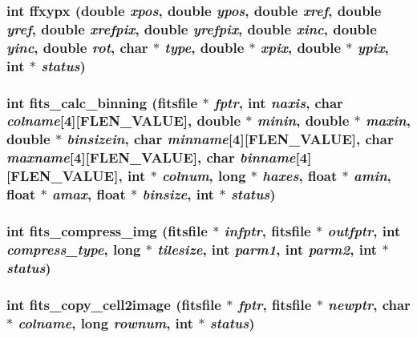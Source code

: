 \subsubsection{\setlength{\rightskip}{0pt plus 5cm}int ffxypx (double {\em xpos}, double {\em ypos}, double {\em xref}, double {\em yref}, double {\em xrefpix}, double {\em yrefpix}, double {\em xinc}, double {\em yinc}, double {\em rot}, char $\ast$ {\em type}, double $\ast$ {\em xpix}, double $\ast$ {\em ypix}, int $\ast$ {\em status})}\label{src_2fitsio_8h_890c3c28eeb1c56fbbb271a8b6bab6aa}


\subsubsection{\setlength{\rightskip}{0pt plus 5cm}int fits\_\-calc\_\-binning (\bf{fitsfile} $\ast$ {\em fptr}, int {\em naxis}, char {\em colname}[4][FLEN\_\-VALUE], double $\ast$ {\em minin}, double $\ast$ {\em maxin}, double $\ast$ {\em binsizein}, char {\em minname}[4][FLEN\_\-VALUE], char {\em maxname}[4][FLEN\_\-VALUE], char {\em binname}[4][FLEN\_\-VALUE], int $\ast$ {\em colnum}, long $\ast$ {\em haxes}, float $\ast$ {\em amin}, float $\ast$ {\em amax}, float $\ast$ {\em binsize}, int $\ast$ {\em status})}\label{src_2fitsio_8h_0e2cdd3a6e198dc69fac9573d398ac99}


\subsubsection{\setlength{\rightskip}{0pt plus 5cm}int fits\_\-compress\_\-img (\bf{fitsfile} $\ast$ {\em infptr}, \bf{fitsfile} $\ast$ {\em outfptr}, int {\em compress\_\-type}, long $\ast$ {\em tilesize}, int {\em parm1}, int {\em parm2}, int $\ast$ {\em status})}\label{src_2fitsio_8h_54de37ff809d979bb6c319989c0b41b7}


\subsubsection{\setlength{\rightskip}{0pt plus 5cm}int fits\_\-copy\_\-cell2image (\bf{fitsfile} $\ast$ {\em fptr}, \bf{fitsfile} $\ast$ {\em newptr}, char $\ast$ {\em colname}, long {\em rownum}, int $\ast$ {\em status})}\label{src_2fitsio_8h_ef2583b75db883c76f767b0fe4d4a0ee}



